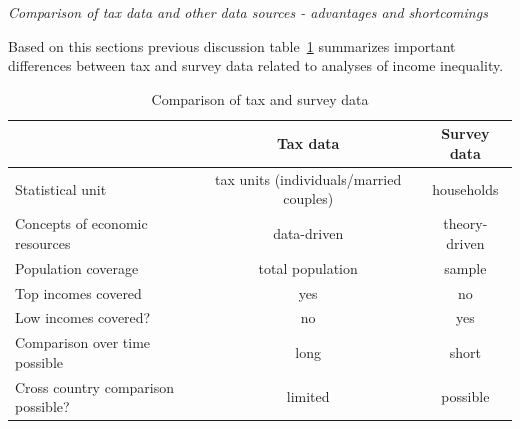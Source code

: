 \documentclass[twoside]{article}\usepackage[]{graphicx}\usepackage[]{color}
\makeatletter
\newcounter{tempcolnum}
\newcommand{\multicolinterrupt}[1]{%
\setcounter{tempcolnum}{\col@number}
\end{multicols}
#1%
\begin{multicols}{\value{tempcolnum}}
}
\makeatother
\begin{document}
\begin{multicols}{2}
\emph{Comparison of tax data and other data sources - advantages and shortcomings}

Based on this sections previous discussion table~\ref{datacomp} summarizes important differences between tax and survey data related to analyses of income inequality. 



\multicolinterrupt{
\begin{table}[H]
\caption{Comparison of tax and survey data\label{datacomp}} 
\begin{center}
\begin{tabular}{lcc}
\hline\hline
                                   & Tax data       & Survey data\\
\hline
Statistical unit                   & tax units (individuals/married couples)  & households\\                                   
Concepts of economic resources  & data-driven   & theory-driven\\
Population coverage & total population & sample \\ 
Top incomes covered                 & yes   & no\\
Low incomes covered?               & no        & yes\\
Comparison over time possible 	   & long       & short \\
Cross country comparison possible? & limited   & possible\\
\hline
\end{tabular}
\end{center}
\end{table}
}



\end{multicols}
\end{document}
